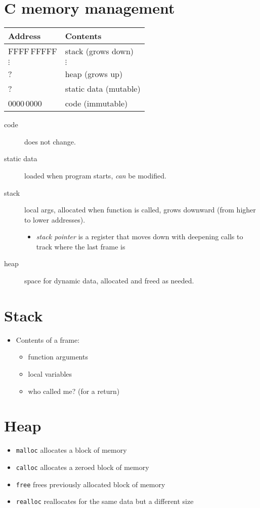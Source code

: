 \section{C memory management}
\begin{tabular}{ll}
	Address & Contents\\\hline
	FFFF\,FFFFF & stack (grows down)\\
	\(\vdots\) & \(\vdots\) \\
	? & heap (grows up) \\
	? & static data (mutable) \\
	0000\,0000 & code (immutable)
\end{tabular}
\begin{description}
	\item[code] does not change.
	\item[static data] loaded when program starts, \emph{can} be modified.
	\item[stack] local args, allocated when function is called, grows downward (from higher to lower addresses).
		\begin{itemize}
			\item \emph{stack pointer} is a register that moves down with deepening calls to track where the last frame is
		\end{itemize}
	\item[heap] space for dynamic data, allocated and freed as needed.
\end{description}

\section{Stack}
\begin{itemize}
	\item Contents of a frame:
		\begin{itemize}
			\item function arguments
			\item local variables
			\item who called me? (for a return)
		\end{itemize}
\end{itemize}

\section{Heap}
\begin{itemize}
	\item \texttt{malloc} allocates a block of memory
	\item \texttt{calloc} allocates a zeroed block of memory
	\item \texttt{free} frees previously allocated block of memory
	\item \texttt{realloc} reallocates for the same data but a different size
\end{itemize}

